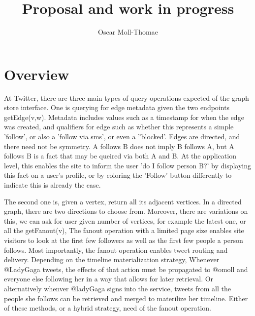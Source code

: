 \documentclass{article}
\author{Oscar Moll-Thomae}
\title{Proposal and work in progress}
\begin{document}
\maketitle


\newcommand{\code}{\ttfamily}
\newcommand{\draftnote}[2][inline]{\todo[#1]{{\bf NOTE:} #2}}
\newcommand{\todonote}[2][inline]{\todo[#1]{{\bf TODO:} #2}}

\newcommand{\edgeq}{{\code getEdge()}}
\newcommand{\fanoutq}[1][]{{\code getFanout(}~#1~{\code )}}
\newcommand{\intersectq}{{\code getIntersection()}}
\newcommand{\randomwalk}{{\code randomWalk()}}



\section{Overview}

At Twitter, there are three main types of query operations expected of the graph store interface. One is querying for edge metadata given the two endpoints {\code getEdge(v,w)}. Metadata includes values such as a timestamp for when the edge was created, and qualifiers for edge such as whether this represents a simple 'follow', or also a  'follow via sms', or even a ''blocked'. Edges are directed, and there need not be symmetry.  A follows B does not imply B follows A, but A follows B is a fact that may be queired via both A and B. At the application level, this enables the site to inform the user  'do I follow person B?' by displaying this fact on a user's profile, or by coloring the 'Follow' button differently to indicate this is already the case.   

The second one is, given a vertex, return all its adjacent vertices. In a directed graph, there are two directions
to choose from. Moreover, there are variations on this, we can ask for user given number of vertices, for example the latest one, or all the   {\code getFanout(v)}, The fanout operation with a limited page size enables site visitors to look at the first few followers as well as the first few people a person follows.   Most importantly, the fanout operation enables tweet routing and delivery. Depending on the timeline materialization strategy, Whenever @LadyGaga tweets, the effects of that action must be propagated to @omoll and  everyone else following her in a way that allows for later retrieval.  Or alternatively whenver @ladyGaga signs into the service, tweets from all the people she follows can be retrieved and merged to materilize her timeline. Either of these methods, or a hybrid strategy, need of the fanout operation.
\end{document}
